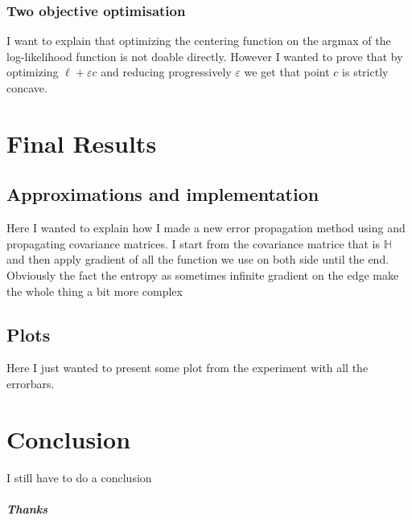 \documentclass[10pt]{report}
\theoremstyle{plain}
\theoremstyle{definition}
\theoremstyle{remark}
\begin{document}
\subsection{Two objective optimisation}

I want to explain that optimizing the centering function on the argmax of the
log-likelihood function is not doable directly. However I wanted to prove that
by optimizing $\ell +
\varepsilon c$ and reducing progressively $\varepsilon$ we get that point $c$ is
strictly concave.



\chapter{Final Results}

\section{Approximations and implementation}

Here I wanted to explain how I made a new error propagation method using and
propagating covariance matrices. I start from the covariance matrice that is
$\mathbb H$ and then apply gradient of all the function we use on both side
until the end. Obviously the fact the entropy as sometimes infinite gradient on
the edge make the whole thing a bit more complex

\section{Plots}

Here I just wanted to present some plot from the experiment with all the errorbars.

\chapter*{Conclusion} %

I still have to do a conclusion



\vfill

\paragraph{\Huge Thanks}

\

\vspace{3mm}
\end{document}
